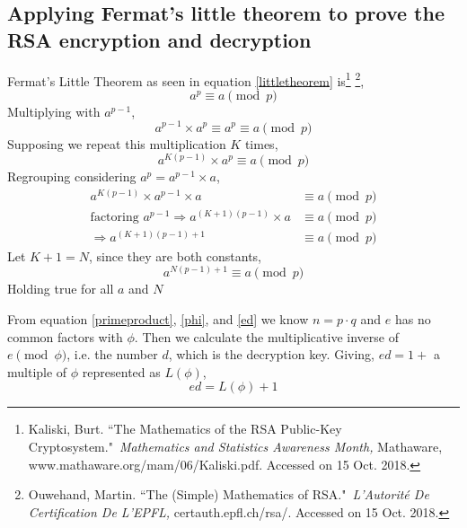 \documentclass[a4paper,12pt]{article}
\theoremstyle{definition}
\begin{document}
\subsection{Applying Fermat's little theorem to prove the RSA encryption and decryption} \label{rsaproof}
Fermat's Little Theorem as seen in equation \ref{littletheorem} is\footnote{Kaliski, Burt. ``The Mathematics of the RSA Public-Key Cryptosystem." \textit{Mathematics and Statistics Awareness Month,} Mathaware, www.mathaware.org/mam/06/Kaliski.pdf. Accessed on 15 Oct. 2018.} \footnote{Ouwehand, Martin. ``The (Simple) Mathematics of RSA." \textit{L'Autorité De Certification De L'EPFL,} certauth.epfl.ch/rsa/. Accessed on 15 Oct. 2018.},
\begin{equation}
	a^p \equiv a \pmod p
\end{equation}
Multiplying with $a^{p-1}$,
\begin{equation}
	a^{p-1} \times a^p \equiv a^p \equiv a \pmod p
\end{equation}
Supposing we repeat this multiplication $K$ times,
\begin{equation}
	a^{K(p-1)} \times a^p \equiv a \pmod p
\end{equation}
Regrouping considering $a^p = a^{p-1} \times a$,
\begin{equation}
\begin{split}
	a^{K(p-1)} \times a^{p-1} \times a & \equiv a \pmod p \\
\text{factoring $a^{p-1}$}	\Rightarrow a^{(K+1)(p-1)} \times a &\equiv a \pmod p \\
	\Rightarrow a^{(K+1)(p-1)+1} & \equiv a \pmod p 
\end{split}
\end{equation}
Let $K+1 = N$, since they are both constants,
\begin{equation} 
	a^{N(p-1)+1} \equiv a \pmod p
\end{equation}
Holding true for all $a$ and $N$

From equation \ref{primeproduct}, \ref{phi}, and \ref{ed} we know  $n = p \cdot q$ and $e$ has no common factors with $\phi$. Then we calculate the multiplicative inverse of $e \pmod{\phi}$, i.e. the number $d$, which is the decryption key. Giving, $ed = 1 +$ a multiple of $\phi$ represented as $L(\phi)$, 
\begin{equation} \label{fermatslittle2}
	ed = L(\phi) +1
\end{equation}
\end{document}
